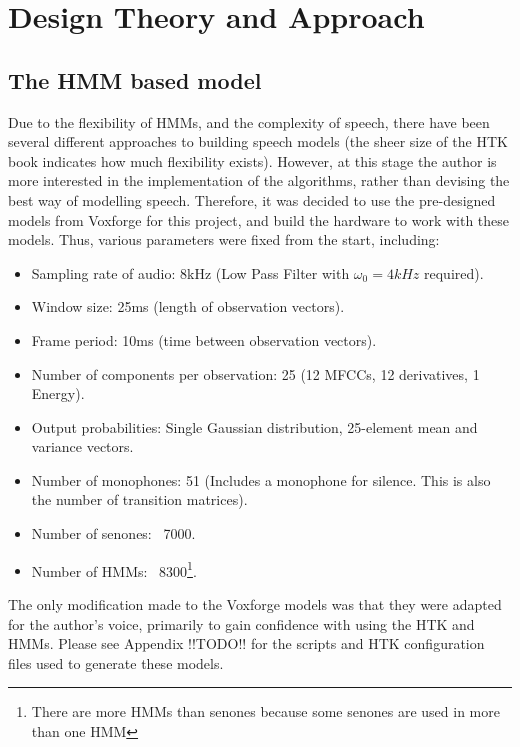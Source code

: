 \chapter{Design Theory and Approach} %
\label{cha:design_approach}


\section{The HMM based model} %
\label{sec:the_hmm_based_model}
	Due to the flexibility of HMMs, and the complexity of speech, there have been several different approaches to building speech models (the sheer size of the HTK book indicates how much flexibility exists).  However, at this stage the author is more interested in the implementation of the algorithms, rather than devising the best way of modelling speech.  Therefore, it was decided to use the pre-designed models from Voxforge for this project, and build the hardware to work with these models.  Thus, various parameters were fixed from the start, including:

	\begin{itemize}
		\item Sampling rate of audio: 8kHz (Low Pass Filter with $\omega_0 = 4kHz$ required).
		\item Window size: 25ms (length of observation vectors).
		\item Frame period: 10ms (time between observation vectors).
		\item Number of components per observation: 25 (12 MFCCs, 12 derivatives, 1 Energy).
		\item Output probabilities: Single Gaussian distribution, 25-element mean and variance vectors.
		\item Number of monophones: 51 (Includes a monophone for silence.  This is also the number of transition matrices).
		\item Number of senones: ~7000.
		\item Number of HMMs: ~8300\footnote{There are more HMMs than senones because some senones are used in more than one HMM}.
	\end{itemize}

	The only modification made to the Voxforge models was that they were adapted for the author's voice, primarily to gain confidence with using the HTK and HMMs.  Please see Appendix !!TODO!! for the scripts and HTK configuration files used to generate these models.

